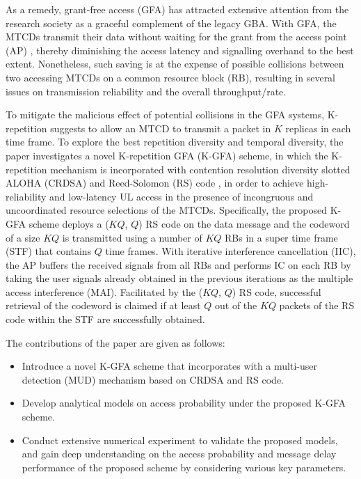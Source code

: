 \documentclass[a4paper]{IEEEtran}
\begin{document}
As a remedy, grant-free access (GFA) has attracted extensive attention from the research society as a graceful complement of the legacy GBA. With GFA, the MTCDs transmit their data without waiting for the grant from the access point (AP) \cite{2-rach, 4-rach}, thereby diminishing the access latency and signalling overhand to the best extent. Nonetheless, such saving is at the expense of possible collisions between two accessing MTCDs on a common resource block (RB), resulting in several issues on transmission reliability and the overall throughput/rate.

To mitigate the malicious effect of potential collisions in the GFA systems, K-repetition suggests to allow an MTCD to transmit a packet in $K$ replicas in each time frame. To explore the best repetition diversity and temporal diversity, the paper investigates a novel K-repetition GFA (K-GFA) scheme, in which the K-repetition mechanism is incorporated with contention resolution diversity slotted ALOHA (CRDSA) and Reed-Solomon (RS) code \cite{NC1, K-scma}, in order to achieve high-reliability and low-latency UL access in the presence of incongruous and uncoordinated resource selections of the MTCDs. Specifically, the proposed K-GFA scheme deploys a ($KQ$, $Q$) RS code on the data message and the codeword of a size $KQ$ is transmitted using a number of $KQ$ RBs in a super time frame (STF) that contains $Q$ time frames. With iterative interference cancellation (IIC), the AP buffers the received signals from all RBs and performs IC on each RB by taking the user signals already obtained in the previous iterations as the multiple access interference (MAI). %
Facilitated by the ($KQ$, $Q$) RS code, successful retrieval of the codeword is claimed if at least $Q$ out of the $KQ$ packets of the RS code within the STF are successfully obtained.    


The contributions of the paper are given as follows:
\begin{itemize}
\item Introduce a novel K-GFA scheme that incorporates with a multi-user detection (MUD) mechanism based on CRDSA and RS code. 
\item Develop analytical models on access probability under the proposed K-GFA scheme. 
\item Conduct extensive numerical experiment to validate the proposed models, and gain deep understanding on the access probability and message delay performance of the proposed scheme by considering various key parameters.
\end{itemize}
\end{document}
